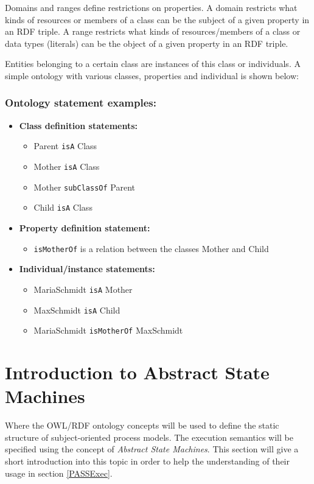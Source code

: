 Domains and ranges define restrictions on properties. A domain restricts what kinds of resources or members of a class can be the subject of a given property in an RDF triple. A range restricts what kinds of resources/members of a class or data types (literals) can be the object of a given property in an RDF triple.

Entities belonging to a certain class are instances of this class or individuals. A simple ontology with various classes, properties and individual is shown below:

\subsubsection{Ontology statement examples:}

\begin{itemize}
	\item \textbf {Class definition statements:}
	\begin{itemize}
		\item Parent \texttt{isA} Class
		\item Mother \texttt{isA} Class
		\item Mother \texttt{subClassOf} Parent
		\item Child \texttt{isA} Class
	\end{itemize}
	\item \textbf {Property definition statement:}
	\begin{itemize}
		\item \texttt{isMotherOf} is a relation between the classes Mother and Child
	\end{itemize}
	\item \textbf{Individual/instance statements:}
	\begin{itemize}
		\item MariaSchmidt \texttt{isA} Mother
		\item MaxSchmidt \texttt{isA} Child
		\item MariaSchmidt \texttt{isMotherOf} MaxSchmidt
	\end{itemize}
\end{itemize}

\section{Introduction to Abstract State Machines}

Where the OWL/RDF ontology concepts will be used to define the static structure of subject-oriented process models. The execution semantics will be specified using the concept of \textit{Abstract State Machines}. This section will give a short introduction into this topic in order to help the understanding of their usage in section \ref{PASSExec}.


